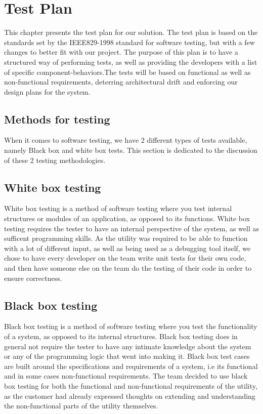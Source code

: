 \chapter{Test Plan}
This chapter presents the test plan for our solution. The test plan is based on
the standards set by the IEEE829-1998 standard for software testing, but with a
few changes to better fit with our project. The purpose of this plan is to have
a structured way of performing tests, as well as providing the developers with
a list of specific component-behaviors.The tests will be based on functional as
well as non-functional requirements, deterring architectural drift and
enforcing our design plans for the system.


\section{Methods for testing}
When it comes to software testing, we have 2 different types of tests available, namely Black box and white box tests. This section is dedicated to the discussion of these 2 testing methodologies.


\section{White box testing}
White box testing is a method of software testing where you test internal structures or modules of an application, as opposed to its functions. White box testing requires the tester to have an internal perspective of the system, as well as sufficent programming skills. As the utility was required to be able to function with a lot of different input, as well as being used as a debugging tool itself, we chose to have every developer on the team write unit tests for their own code, and then have someone else on the team do the testing of their code in order to ensure correctness.


\section{Black box testing}
Black box testing is a method of software testing where you test the functionality of a system, as opposed to its internal structures. Black box testing does in general not require the tester to have any intimate knowledge about the system or any of the programming logic that went into making it. Black box test cases are built around the specifications and requirements of a system, i.e its functional and in some cases non-functional requirements. The team decided to use black box testing for both the functional and non-functional requirements of the utility, as the customer had already expressed thoughts on extending and understanding the non-functional parts of the utility themselves. 


